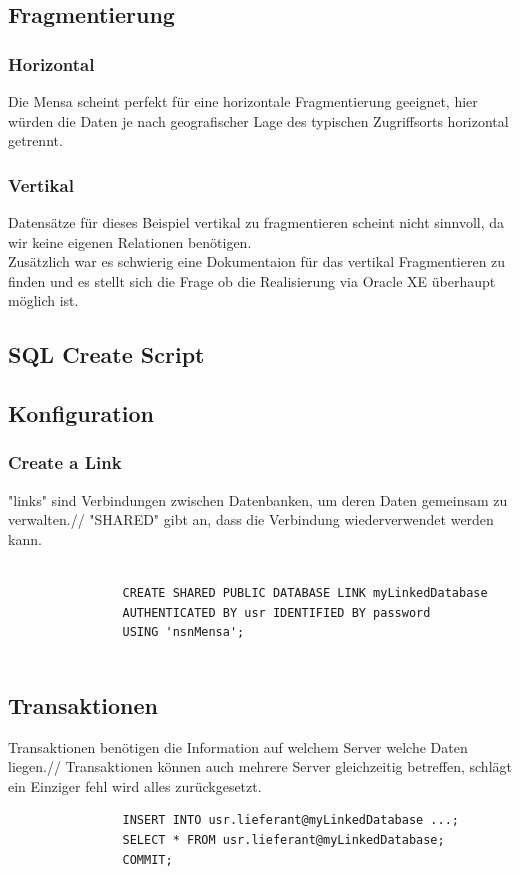 \documentclass[12pt,a4paper]{article}
\begin{document}
		\subsection{Fragmentierung}
			\subsubsection{Horizontal}
				Die Mensa scheint perfekt für eine horizontale Fragmentierung geeignet, hier würden die Daten je nach geografischer Lage des typischen Zugriffsorts horizontal getrennt.
			\subsubsection{Vertikal}
				Datensätze für dieses Beispiel vertikal zu fragmentieren scheint nicht sinnvoll, da wir keine eigenen Relationen benötigen.\\
				Zusätzlich war es schwierig eine Dokumentaion für das vertikal Fragmentieren zu finden und es stellt sich die Frage ob die Realisierung via Oracle XE überhaupt möglich ist.
		\newpage
		\subsection{SQL Create Script}
		
		{\scriptsize 	}
		\subsection{Konfiguration}
			\subsubsection{Create a Link}
			
				"links" sind Verbindungen zwischen Datenbanken, um deren Daten gemeinsam zu verwalten.//
				"SHARED" gibt an, dass die Verbindung wiederverwendet werden kann.
				\begin{verbatim}

				CREATE SHARED PUBLIC DATABASE LINK myLinkedDatabase
				AUTHENTICATED BY usr IDENTIFIED BY password
				USING 'nsnMensa';
				
				\end{verbatim}
				
        \subsection{Transaktionen}
            Transaktionen benötigen die Information auf welchem Server welche Daten liegen.//
            Transaktionen können auch mehrere Server gleichzeitig betreffen, schlägt ein Einziger fehl wird alles zurückgesetzt.
            \begin{verbatim}
                INSERT INTO usr.lieferant@myLinkedDatabase ...;
                SELECT * FROM usr.lieferant@myLinkedDatabase;
                COMMIT;
	        \end{verbatim}
\end{document}
